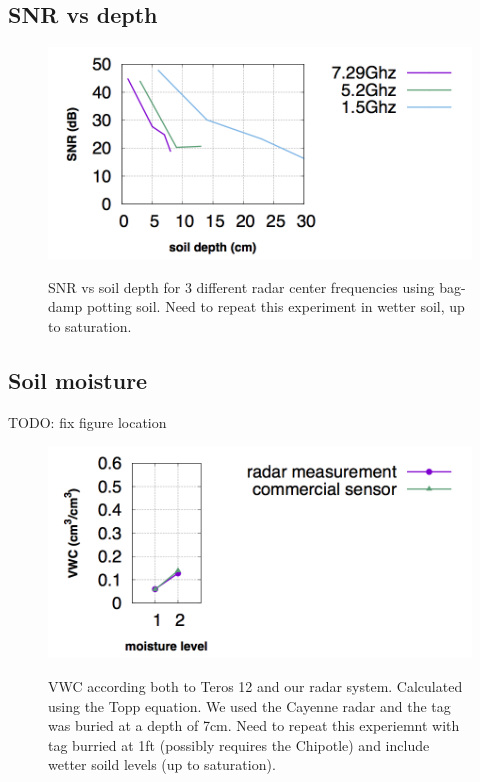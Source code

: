 \documentclass[12pt]{article}
\begin{document}
\subsection*{SNR vs depth}
\begin{figure}[h!]
  \centering
  \includegraphics[scale=0.75]{../graphs/snr.png}\\
  \caption{SNR vs soil depth for 3 different radar center frequencies
    using bag-damp potting soil. Need to repeat this experiment in
    wetter soil, up to saturation.}
  \label{figure:depth}
\end{figure}

\subsection*{Soil moisture}

TODO: fix figure location

\begin{figure}[h!]
  \centering
  \includegraphics[scale=0.75]{../graphs/vwc.png}\\
  \caption{VWC according both to Teros 12 and our radar
    system. Calculated using the Topp equation. We used the Cayenne
    radar and the tag was buried at a depth of 7cm. Need to repeat
    this experiemnt with tag burried at 1ft (possibly requires the
    Chipotle) and include wetter soild levels (up to saturation).}
  \label{figure:moisture}
\end{figure}
\end{document}
